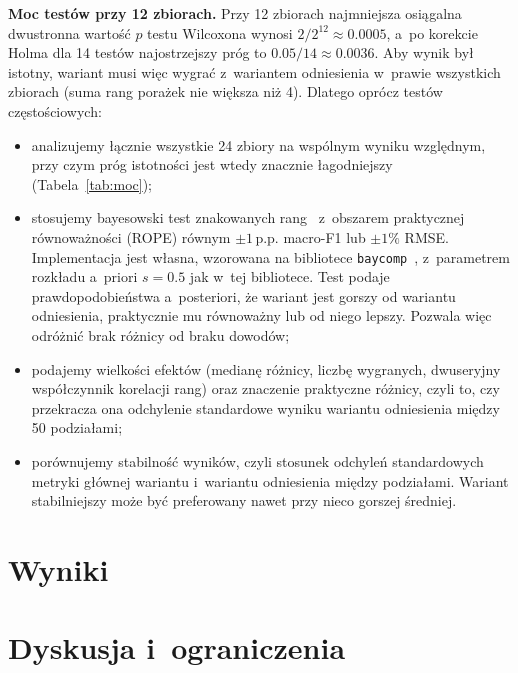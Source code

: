 \documentclass[11pt,a4paper]{article}
\newcommand{\pp}{\,p.p.}
\begin{document}
\textbf{Moc testów przy 12 zbiorach.} Przy 12 zbiorach najmniejsza osiągalna dwustronna wartość $p$ testu Wilcoxona wynosi $2/2^{12}\approx0.0005$, a~po korekcie Holma dla 14 testów najostrzejszy próg to $0.05/14\approx0.0036$. Aby wynik był istotny, wariant musi więc wygrać z~wariantem odniesienia w~prawie wszystkich zbiorach (suma rang porażek nie większa niż 4). Dlatego oprócz testów częstościowych:
\begin{itemize}
  \item analizujemy łącznie wszystkie 24 zbiory na wspólnym wyniku względnym, przy czym próg istotności jest wtedy znacznie łagodniejszy (Tabela~\ref{tab:moc});
  \item stosujemy bayesowski test znakowanych rang~\cite{benavoli2017} z~obszarem praktycznej równoważności (ROPE) równym $\pm1$\pp{} macro-F1 lub $\pm1\%$ RMSE. Implementacja jest własna, wzorowana na bibliotece \texttt{baycomp}~\cite{baycomp}, z~parametrem rozkładu a~priori $s=0.5$ jak w~tej bibliotece. Test podaje prawdopodobieństwa a~posteriori, że wariant jest gorszy od wariantu odniesienia, praktycznie mu równoważny lub od niego lepszy. Pozwala więc odróżnić brak różnicy od braku dowodów;
  \item podajemy wielkości efektów (medianę różnicy, liczbę wygranych, dwuseryjny współczynnik korelacji rang) oraz znaczenie praktyczne różnicy, czyli to, czy przekracza ona odchylenie standardowe wyniku wariantu odniesienia między 50 podziałami;
  \item porównujemy stabilność wyników, czyli stosunek odchyleń standardowych metryki głównej wariantu i~wariantu odniesienia między podziałami. Wariant stabilniejszy może być preferowany nawet przy nieco gorszej średniej.
\end{itemize}



\section{Wyniki}
\label{sec:wyniki}



\section{Dyskusja i~ograniczenia}
\end{document}
